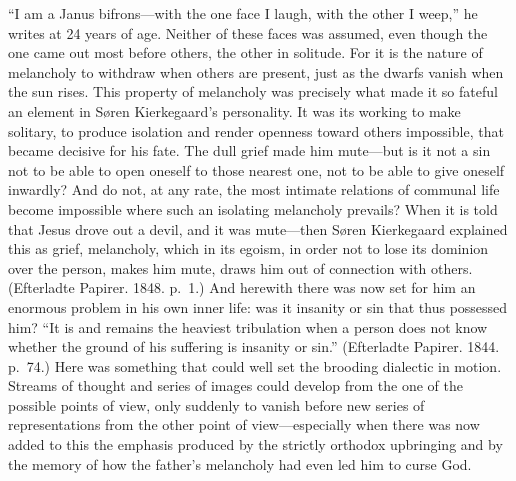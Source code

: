 \documentclass[12pt,a4paper]{book}
\newcommand{\opage}[1]{\marginnote{\footnotesize\textit{[#1]}}}
\begin{document}
``I am a Janus bifrons---with the one face I laugh, with the other I
weep,'' he writes at 24 years of age. Neither of these faces was assumed,
even though the one came out most before others, the other in solitude.
For it is the nature of melancholy to withdraw when others are present,
just as the dwarfs vanish when the sun rises. This property of melancholy
was precisely what made it so fateful an element in Søren Kierkegaard's
personality. It was its working to make solitary, to produce isolation
and render openness toward others impossible, that became decisive for
his fate. The dull grief made him mute---but is it not a sin not to be
able to open oneself to those nearest one, not to be able to give oneself
inwardly? And do not, at any rate, the most intimate relations of
communal life become impossible where such an isolating melancholy
prevails? When it is told that Jesus drove out a devil, and it was
mute---then Søren Kierkegaard explained this as grief, melancholy, which
in its egoism, in order not to lose its dominion over the person, makes
him mute, draws him out of
\opage{35}connection with others. (Efterladte Papirer. 1848. p.~1.) And
herewith there was now set for him an enormous problem in his own inner
life: was it insanity or sin that thus possessed him? ``It is and remains
the heaviest tribulation when a person does not know whether the ground
of his suffering is insanity or sin.'' (Efterladte Papirer. 1844.
p.~74.) Here was something that could well set the brooding dialectic in
motion. Streams of thought and series of images could develop from the
one of the possible points of view, only suddenly to vanish before new
series of representations from the other point of view---especially when
there was now added to this the emphasis produced by the strictly
orthodox upbringing and by the memory of how the father's melancholy had
even led him to curse God.
\end{document}
